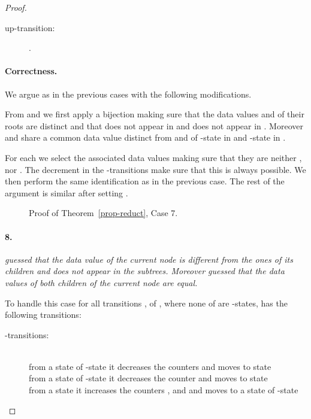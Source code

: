 \documentclass{CSML}
\begin{document}
\begin{proof}
\begin{description}
\item[\rm up-transition:]
.
\end{description}

\paragraph{\bf Correctness.}  
We argue as in the previous cases with the following modifications.

From  and  we first apply a bijection making sure that the
data values  and  of their roots are distinct and that  does not
appear in  and  does not appear in
. Moreover  and  share a common data value 
distinct from  and  of -state  in  and
-state  in .

For each  we select the associated data values making sure
that they are neither ,  nor . The decrement in the -transitions make sure
that this is always possible. We then perform the same identification as in the
previous case. 
The rest of the argument is similar after setting .

\begin{figure}
\small

\caption{Proof of Theorem~\ref{prop-reduct}, Case 7.}
\label{fig-reduct7}
\end{figure}










\paragraph{\bf 8.} 
\emph{ guessed that the data value  of the
  current node is different from the ones of its children and does not appear
  in the subtrees.  Moreover  guessed that the data values of both
  children of the current node are equal.}

\noindent
To handle this case for all transitions 
,
 of , 
where none of  are -states,  has the following transitions:
\begin{description}
\item[\rm -transitions:]\quad\\
from a state  of -state 
it decreases the counters  
and moves to state \\
from a state  of -state  
it decreases the counter  
and moves to state \\
from a state  
it increases the counters , and  
and moves to a state  of -state 


\end{description}
\end{proof}
\end{document}
